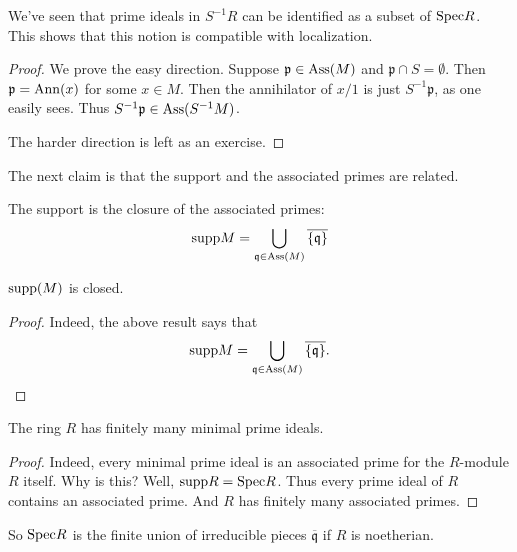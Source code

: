 We've seen that prime ideals in $S^{-1}R$ can be identified as a subset of
$\mathrm{Spec} R$. This shows that this notion is compatible with localization.

\begin{proof} 
We prove the easy direction. Suppose $\mathfrak{p} \in \mathrm{Ass}(M)$ and
$\mathfrak{p} \cap S = \emptyset$. Then $\mathfrak{p} = \mathrm{Ann}(x)$ for some $x
\in M$. Then the annihilator of $x/1$ is just $S^{-1}\mathfrak{p}$, as one
easily sees. Thus $S^{-1}\mathfrak{p} \in \mathrm{Ass}(S^{-1}M)$.

The harder direction is left as an exercise.
\end{proof} 

The next claim is that the support and the associated primes are related.

\begin{proposition} The support is the closure of the associated primes:
\[ \mathrm{supp} M  = \bigcup_{\mathfrak{q} \in \mathrm{Ass}(M)}
\overline{\left\{\mathfrak{q}\right\}} \]
\end{proposition} 

\begin{corollary} 
$\mathrm{supp}(M)$ is closed.
\end{corollary} 
\begin{proof} 
Indeed, the above result says that
\[ \mathrm{supp} M  = \bigcup_{\mathfrak{q} \in \mathrm{Ass}(M)}
\overline{\left\{\mathfrak{q}\right\}}. \]
\end{proof} 
\begin{corollary} 
The ring $R$ has finitely many minimal prime ideals. 
\end{corollary} 
\begin{proof} 
Indeed, every minimal prime ideal is an associated prime for the $R$-module $R$
itself. Why is this? Well, $\mathrm{supp} R = \mathrm{Spec} R$. Thus every prime ideal of $R$
contains an associated prime. And $R$ has finitely many associated primes.
\end{proof} 

\begin{remark} 
So $\mathrm{Spec} R$ is the finite union of irreducible pieces
$\overline{\mathfrak{q}}$ if $R$ is noetherian.
\end{remark}

